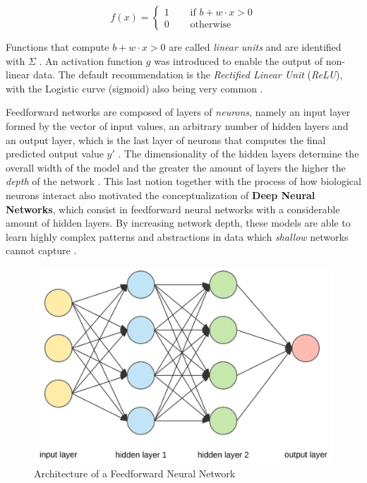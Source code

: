\begin{equation} \label{eq:perceptron}
	f(x) =
	\left\{ \begin{aligned} 
		1 &\quad \text{ if } b + w \cdot x > 0\\
		0 &\quad \text{ otherwise} 
	\end{aligned} \right.
\end{equation}

Functions that compute $b + w \cdot x > 0$ are called \textit{linear units} and are identified with $\Sigma$ \cite{charniakIntroductionDeepLearning2018, goodfellowDeepLearning2016}. An activation function $g$ was introduced to enable the output of non-linear data. The default recommendation is the \textit{Rectified Linear Unit} (\textit{ReLU}), with the Logistic curve (sigmoid) also being very common \cite{goodfellowDeepLearning2016}.  \par
Feedforward networks are composed of layers of \textit{neurons}, namely an input layer formed by the vector of input values, an arbitrary number of hidden layers and an output layer, which is the last layer of neurons that computes the final predicted output value $y'$ \cite{charniakIntroductionDeepLearning2018}. The dimensionality of the hidden layers determine the overall width of the model and the greater the amount of layers the higher the \textit{depth} of the network \cite{charniakIntroductionDeepLearning2018, goodfellowDeepLearning2016}. This last notion together with the process of how biological neurons interact also motivated the conceptualization of \textbf{Deep Neural Networks}, which consist in feedforward neural networks with a considerable amount of hidden layers. By increasing network depth, these models are able to learn highly complex patterns and abstractions in data which \textit{shallow} networks cannot capture \cite{goodfellowDeepLearning2016}. \par

\begin{figure}[ht!]
	\centering
	\includegraphics[width=0.50\linewidth]{./figures/fnn.jpg}
	\caption{Architecture of a Feedforward Neural Network \cite{FeedforwardNeuralNetwork}}
	\label{fig:fnn}
\end{figure}

